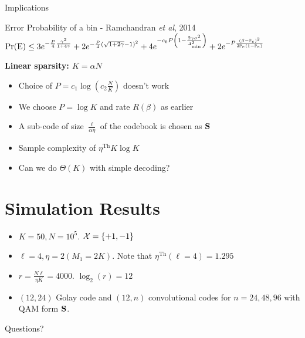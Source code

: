 \documentclass[10pt]{beamer}
\begin{document}
\begin{frame}{Implications}
\begin{block}{Error Probability of a bin - Ramchandran \textit{et al}, 2014}
$\text{Pr(E)}\leq 3e^{-\frac{P}{4}\frac{\gamma^2}{1+4 \gamma}}+2e^{-\frac{P}{4}(\sqrt{1+2\gamma}-1)^2}+4e^{-c_6 P\left(1-\frac{2\gamma\sigma^2}{A^{2}_{\text{min}}}\right)}+2e^{-P\frac{\left(\beta-\mathbb{P}_{e}\right)^2}{2\mathbb{P}_{e}(1-\mathbb{P}_{e})}}$
\end{block}

\vspace{2ex}
\begin{description}
    \item [\textbf{Linear sparsity: $K=\alpha N$}]
\end{description}
\begin{itemize}
\item Choice of $P=c_{1}\log\left(c_2 \frac{N}{K}\right)$ doesn't work
\item We choose $P=\log K$ and rate $R(\beta)$ as earlier
\item A sub-code of size $\frac{\ell}{\alpha\eta}$ of the codebook is chosen as $\mathbf{S}$
\item Sample complexity of $\eta^{\text{Th}}K\log K$
\item Can we do $\Theta(K)$ with simple decoding?
\end{itemize}
\end{frame}

\section{Simulation Results}
\begin{frame}
\begin{itemize}
\item $K=50, N=10^5$. $\mathcal{X}=\{+1,-1\}$
\item $\ell=4, \eta =2 (M_1 =2K)$. Note that $\eta^{\text{Th}}(\ell=4)=1.295$
\item $r=\frac{N\ell}{\eta K}=4000$. $\log_2(r)=12$
\item $(12,24)$ Golay code and $(12,n)$ convolutional codes for $n=24,48,96$ with QAM form $\mathbf{S}$.
\end{itemize}

\begin{figure}
\resizebox{0.5\textwidth}{!}{
\begin{centering}

\end{centering}
}
\end{figure}
\end{frame}


\begin{frame}[c]
\begin{center}
\Huge{Questions?}
\end{center}
\end{frame}
\end{document}
